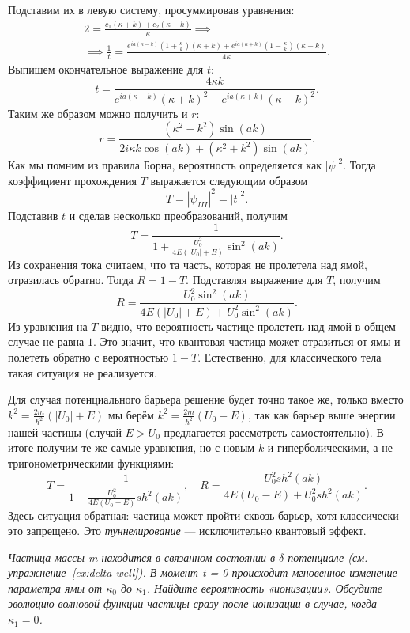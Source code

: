 Подставим их в левую систему, просуммировав уравнения:
\begin{gather*}
  2 = \frac{c_1(\kappa + k) + c_2 (\kappa - k)}{\kappa}  \implies \\
  \implies \frac{1}{t} = \frac{e^{ia(\kappa - k)}(1 + \frac{\kappa}{k})(\kappa + k) + e^{ia(\kappa + k)}(1 - \frac{\kappa}{k}) (\kappa - k) }{4\kappa}.
\end{gather*}
Выпишем окончательное выражение для $t$:
\[
  t = \frac{4\kappa k}{e^{ia(\kappa - k)}(\kappa + k)^2 - e^{ia(\kappa + k)}(\kappa - k)^2}.
\]
Таким же образом можно получить и $r$:
\[
  r = \frac{(\kappa^2 - k^2)\sin (ak)}{2i\kappa k\cos(ak) + (\kappa^2 + k^2)\sin (ak)}.
\]
Как мы помним из правила Борна, вероятность определяется как $|\psi|^2$. Тогда
коэффициент прохождения $T$ выражается следующим образом
\[
  T = |\psi_{III}|^2 = |t|^2.
\]
Подставив $t$ и сделав несколько преобразований, получим
\[
  T = \frac{1}{1 + \frac{U_0^2}{4E(|U_0| + E)}\sin^2 (ak)}.
\]
Из сохранения тока считаем, что та часть, которая не пролетела над ямой,
отразилась обратно. Тогда $R = 1 - T$. Подставляя выражение для $T$, получим
\[
  R = \frac{U_0^2 \sin^2(ak)}{4E(|U_0| + E) + U_0^2 \sin^2(ak)}.
\]
Из уравнения на $T$ видно, что вероятность частице пролететь над ямой в общем
случае не равна $1$. Это значит, что квантовая частица может отразиться от ямы
и полететь обратно с вероятностью $1 - T$. Естественно, для классического тела
такая ситуация не реализуется.

Для случая потенциального барьера решение будет точно такое же, только вместо $
  k^2 = \frac{2m}{\hbar^2}(|U_0| + E)$ мы берём $k^2 = \frac{2m}{\hbar^2}(U_0 -
  E)$, так как барьер выше энергии нашей частицы (случай $E > U_0$ предлагается
рассмотреть самостоятельно). В итоге получим те же самые уравнения, но с новым
$k$ и гиперболическими, а не тригонометрическими функциями:
\[
  T = \frac{1}{1 + \frac{U_0^2}{4E(U_0 - E)}sh^2 (ak)},\quad R = \frac{U_0^2 sh^2(ak)}{4E(U_0 - E) + U_0^2 sh^2(ak)}.
\]
Здесь ситуация обратная: частица может пройти сквозь барьер, хотя классически
это запрещено. Это \textit{туннелирование} --- исключительно квантовый эффект.
\qedsq
\begin{exercise}
  \textit{Частица массы m находится в связанном состоянии в $\delta$-потенциале
    (см. упражнение \textnumero\,\ref{ex:delta-well}). В момент t = 0 происходит
    мгновенное изменение параметра ямы от $\kappa_0$ до $\kappa_1$. Найдите
    вероятность «ионизации». Обсудите эволюцию волновой функции частицы сразу после
    ионизации в случае, когда $\kappa_1=0$.}
\end{exercise}

